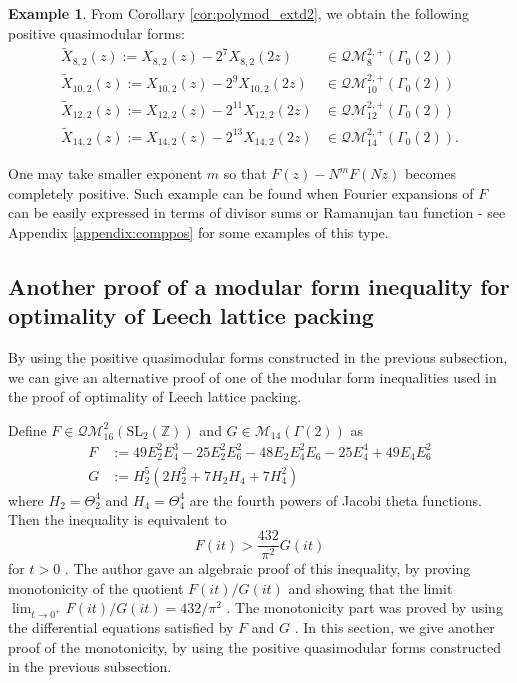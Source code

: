 \documentclass[10pt,reqno]{amsproc}
\newcommand{\SL}{\mathrm{SL}}
\newcommand{\QM}{\mathcal{QM}}
\newcommand{\bZ}{\mathbb{Z}}
\newcommand{\cM}{\mathcal{M}}
\newcommand{\1}{\mathds{1}}	%
\theoremstyle{definition}
\newtheorem{example}[theorem]{Example}
\theoremstyle{remark}
\begin{document}
\begin{example}
    \label{ex:polymod_level2_d2}
    From Corollary \ref{cor:polymod_extd2}, we obtain the following positive quasimodular forms:
    \begin{align*}
        \widetilde{X}_{8, 2}(z) := X_{8, 2}(z) - 2^{7} X_{8, 2}(2z) & \in \QM_{8}^{2, +}(\Gamma_0(2)) \\
        \widetilde{X}_{10, 2}(z) := X_{10, 2}(z) - 2^{9} X_{10, 2}(2z) & \in \QM_{10}^{2, +}(\Gamma_0(2)) \\
        \widetilde{X}_{12, 2}(z) := X_{12, 2}(z) - 2^{11} X_{12, 2}(2z) & \in \QM_{12}^{2, +}(\Gamma_0(2)) \\
        \widetilde{X}_{14, 2}(z) := X_{14, 2}(z) - 2^{13} X_{14, 2}(2z) & \in \QM_{14}^{2, +}(\Gamma_0(2)).
    \end{align*}
\end{example}

One may take smaller exponent $m$ so that $F(z) - N^m F(Nz)$ becomes completely positive. Such example can be found when Fourier expansions of $F$ can be easily expressed in terms of divisor sums or Ramanujan tau function - see Appendix \ref{appendix:comppos} for some examples of this type.

\subsection{Another proof of a modular form inequality for optimality of Leech lattice packing}
\label{subsec:application_packingineq}

By using the positive quasimodular forms constructed in the previous subsection, we can give an alternative proof of one of the modular form inequalities \cite[Lemma A.2]{cohn2017sphere} used in the proof of optimality of Leech lattice packing.

Define $F \in \QM_{16}^{2}(\SL_2(\bZ))$ and $G \in \cM_{14}(\Gamma(2))$ as
\begin{align}
    F &:= 49 E_2^2 E_4^3 - 25 E_2^2 E_6^2 - 48 E_2 E_4^2 E_6 - 25 E_4^4 + 49 E_4 E_6^2 \label{eqn:F} \\
    G &:= H_2^5 (2 H_2^2 + 7 H_2 H_4 + 7 H_4^2) \label{eqn:G}
\end{align}
where $H_2 = \Theta_2^4$ and $H_4 = \Theta_4^4$ are the fourth powers of Jacobi theta functions.
Then the inequality \cite[Lemma A.2]{cohn2017sphere} is equivalent to
\[
F(it) > \frac{432}{\pi^2} G(it)
\]
for $t > 0$ \cite[eq. (60)]{lee2024algebraic}.
The author gave an algebraic proof of this inequality, by proving monotonicity of the quotient $F(it)/G(it)$ \cite[Proposition 6.5]{lee2024algebraic} and showing that the limit $\lim_{t \to 0^+} F(it)/G(it) = 432/\pi^2$ \cite[Proposition 6.4]{lee2024algebraic}.
The monotonicity part was proved by using the differential equations satisfied by $F$ and $G$ \cite[eq. (64), (65)]{lee2024algebraic}.
In this section, we give another proof of the monotonicity, by using the positive quasimodular forms constructed in the previous subsection.
\end{document}
